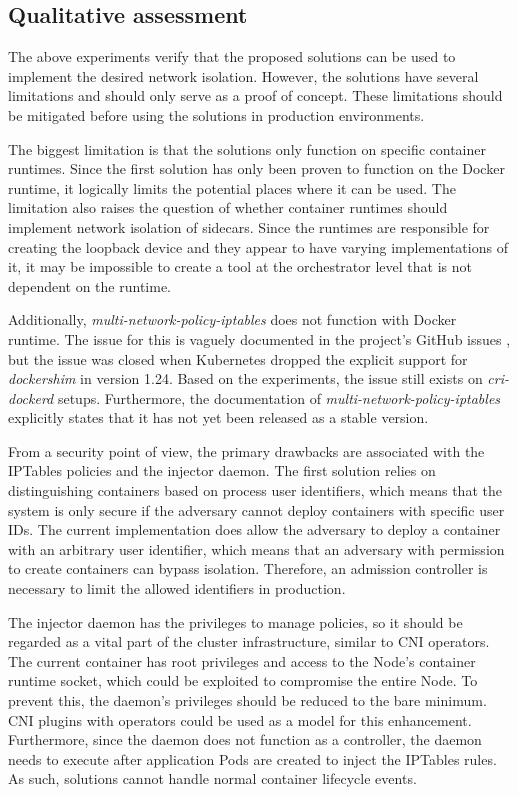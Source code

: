 \documentclass[english, 12pt, a4paper, sci, utf8, a-2b, online]{aaltothesis}
\begin{document}
\subsection{Qualitative assessment}

The above experiments verify that the proposed solutions can be used to implement the desired network isolation.
However, the solutions have several limitations and should only serve as a proof of concept.
These limitations should be mitigated before using the solutions in production environments.

The biggest limitation is that the solutions only function on specific container runtimes.
Since the first solution has only been proven to function on the Docker runtime, it logically limits the potential places where it can be used.
The limitation also raises the question of whether container runtimes should implement network isolation of sidecars.
Since the runtimes are responsible for creating the loopback device and they appear to have varying implementations of it, it may be impossible to create a tool at the orchestrator level that is not dependent on the runtime.

Additionally, \emph{multi-network-policy-iptables} does not function with Docker runtime.
The issue for this is vaguely documented in the project's GitHub issues \cite{multi-network-policy-iptables-bug}, but the issue was closed when Kubernetes dropped the explicit support for \emph{dockershim} in version 1.24.
Based on the experiments, the issue still exists on \emph{cri-dockerd} setups.
Furthermore, the documentation of \emph{multi-network-policy-iptables} explicitly states that it has not yet been released as a stable version.

From a security point of view, the primary drawbacks are associated with the IPTables policies and the injector daemon.
The first solution relies on distinguishing containers based on process user identifiers, which means that the system is only secure if the adversary cannot deploy containers with specific user IDs.
The current implementation does allow the adversary to deploy a container with an arbitrary user identifier, which means that an adversary with permission to create containers can bypass isolation.
Therefore, an admission controller is necessary to limit the allowed identifiers in production.

The injector daemon has the privileges to manage policies, so it should be regarded as a vital part of the cluster infrastructure, similar to CNI operators.
The current container has root privileges and access to the Node's container runtime socket, which could be exploited to compromise the entire Node.
To prevent this, the daemon's privileges should be reduced to the bare minimum.
CNI plugins with operators could be used as a model for this enhancement.
Furthermore, since the daemon does not function as a controller, the daemon needs to execute after application Pods are created to inject the IPTables rules.
As such, solutions cannot handle normal container lifecycle events.
\end{document}
